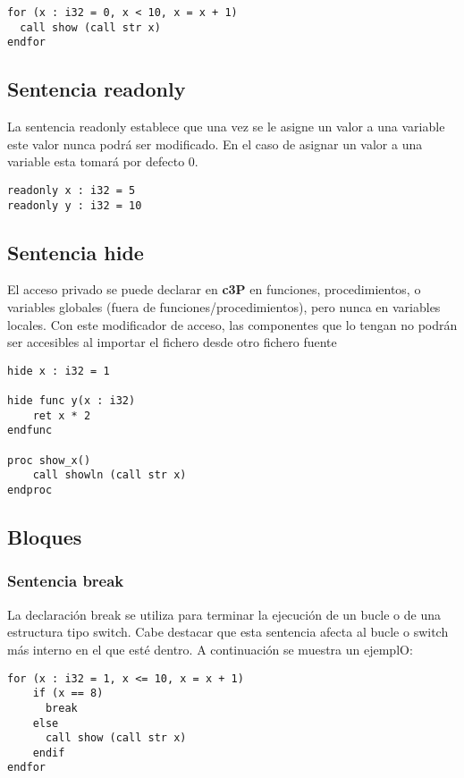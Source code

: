 \begin{verbatim}
for (x : i32 = 0, x < 10, x = x + 1)
  call show (call str x)
endfor
\end{verbatim}

\subsection{Sentencia readonly}

La sentencia readonly establece que una vez se le asigne un valor a una variable este valor nunca podrá ser modificado. En el caso de asignar un valor a una variable esta tomará por defecto 0.

\begin{verbatim}
readonly x : i32 = 5
readonly y : i32 = 10
\end{verbatim}

\subsection{Sentencia hide}

El acceso privado se puede declarar en \textbf{c3P} en funciones, procedimientos,
o variables globales (fuera de funciones/procedimientos), pero nunca en variables
locales. Con este modificador de acceso, las componentes que lo tengan no podrán
ser accesibles al importar el fichero desde otro fichero fuente

\begin{verbatim}
hide x : i32 = 1

hide func y(x : i32)
    ret x * 2
endfunc

proc show_x()
    call showln (call str x)
endproc
\end{verbatim}

\subsection{Bloques}
\subsubsection{Sentencia break}

La declaración break se utiliza para terminar la ejecución de un bucle
o de una estructura tipo switch. Cabe destacar que esta sentencia afecta
al bucle o switch más interno en el que esté dentro.
A continuación se muestra un ejemplO:

\begin{verbatim}
for (x : i32 = 1, x <= 10, x = x + 1)
    if (x == 8)
      break
    else
      call show (call str x)
    endif
endfor
\end{verbatim}

